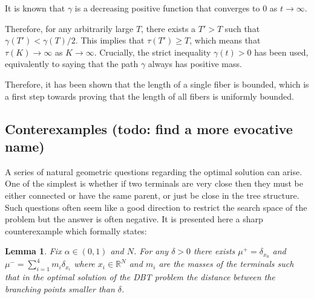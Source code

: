 \documentclass[12pt,a4paper]{article}
\numberwithin{equation}{section}
\theoremstyle{mytheorem}
\newtheorem{lemma}[subsection]{Lemma}
\theoremstyle{myremark}
\theoremstyle{myparagraph}
\newcommand{\R}{\mathbb{R}}
\begin{document}
    It is known that $\gamma$ is a decreasing positive function that converges to $0$ as $t \to \infty$. 
    
    Therefore, for any arbitrarily large $T$, there exists a $T' > T$ such that $\gamma(T') < \gamma(T) / 2$.
    This implies that $\tau(T') \ge T$, which means that $\tau(K) \to \infty$ as $K \to \infty$.
    Crucially, the strict inequality $\gamma(t) > 0$ has been used, equivalently to saying that the path $\gamma$ 
    always has positive mass.

    Therefore, it has been shown that the length of a single fiber is bounded, which is a first step towards 
    proving that the length of all fibers is uniformly bounded.
    





    \subsection{Conterexamples (todo: find a more evocative name)}

    A series of natural geometric questions regarding the optimal solution can arise. One of the simplest is whether if two terminals are very close
    then they must be either connected or have the same parent, or just be close in the tree structure. Such questions often seem like a good direction
    to restrict the search space of the problem but the answer is often negative. It is presented here a sharp counterexample which formally states:
    \begin{lemma}
        Fix $\alpha \in (0,1)$ and $N$. For any $\delta > 0$ there exists $\mu^+ = \delta_{x_0}$ and $\mu^- = \sum_{i=1}^{4} m_i \delta_{x_i}$
        where $x_i \in \R^N$ and $m_i$ are the masses of the terminals such that in the optimal solution of the DBT problem the distance between
        the branching points smaller than $\delta$.
    \end{lemma}
    
\end{document}
